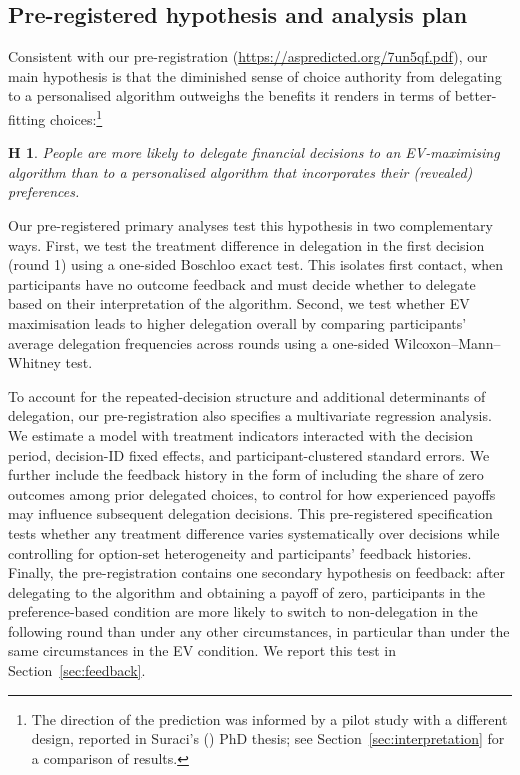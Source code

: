 \documentclass[a4paper, 12pt, fleqn]{article}
\theoremstyle{hypstyle}
\newtheorem{hyp}{H}
\begin{document}
\subsection*{Pre-registered hypothesis and analysis plan}
Consistent with our pre-registration ({\scriptsize\url{https://aspredicted.org/7un5qf.pdf}}), our main hypothesis is that the diminished sense of choice authority from delegating to a personalised algorithm outweighs the benefits it renders in terms of better-fitting choices:\footnote{The direction of the prediction was informed by a pilot study with a different design, reported in Suraci's (\citeyear{suraci_2024}) PhD thesis; see Section~\ref{sec:interpretation} for a comparison of results.}
\begin{hyp}
	People are more likely to delegate financial decisions to an EV-maximising algorithm than to a personalised algorithm that incorporates their (revealed) preferences.
\end{hyp}

Our pre-registered primary analyses test this hypothesis in two complementary ways. First, we test the treatment difference in delegation in the first decision (round 1) using a one-sided Boschloo exact test. This isolates first contact, when participants have no outcome feedback and must decide whether to delegate based on their interpretation of the algorithm. Second, we test whether EV maximisation leads to higher delegation overall by comparing participants' average delegation frequencies across rounds using a one-sided Wilcoxon--Mann--Whitney test.

To account for the repeated-decision structure and additional determinants of delegation, our pre-registration also specifies a multivariate regression analysis. We estimate a model with treatment indicators interacted with the decision period, decision-ID fixed effects, and participant-clustered standard errors. We further include the feedback history in the form of including the share of zero outcomes among prior delegated choices, to control for how experienced payoffs may influence subsequent delegation decisions. This pre-registered specification tests whether any treatment difference varies systematically over decisions while controlling for option-set heterogeneity and participants' feedback histories. Finally, the pre-registration contains one secondary hypothesis on feedback: after delegating to the algorithm and obtaining a payoff of zero, participants in the preference-based condition are more likely to switch to non-delegation in the following round than under any other circumstances, in particular than under the same circumstances in the EV condition. We report this test in Section~\ref{sec:feedback}.
\end{document}
